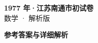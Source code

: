 \documentclass[zihao=-4, a4paper]{ctexart}
\begin{document}
\begin{center}
  {\Large\bfseries 1977 年·江苏南通市初试卷}\\[4pt]
  {\large 数学 · 解析版}
\end{center}
\medskip
{}

\clearpage
{}
\begin{center}{\Large\bfseries 参考答案与详细解析}\end{center}
\medskip

\end{document}
